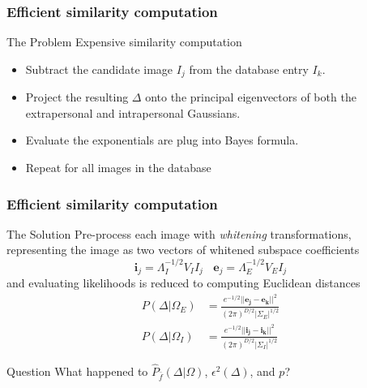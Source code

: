 \documentclass{beamer}
\begin{document}
\begin{frame}
\frametitle{Efficient similarity computation}
\begin{block}{The Problem}
Expensive similarity computation
\begin{itemize}
\pause
\item Subtract the candidate image $I_j$ from the database entry $I_k$.
\pause
\item Project the resulting $\Delta$ onto the principal eigenvectors of both the extrapersonal and intrapersonal Gaussians.
\pause
\item Evaluate the exponentials are plug into Bayes formula.
\pause
\item Repeat for all images in the database
\end{itemize}
\end{block}
\end{frame}

\begin{frame}
\frametitle{Efficient similarity computation}
\begin{block}{The Solution}
Pre-process each image with \emph{whitening} transformations, representing the image as two vectors of whitened subspace coefficients
\pause
\begin{equation}
\mathbf{i}_j=\Lambda_I^{-1/2}V_II_j\ \ \ \ \mathbf{e}_j=\Lambda_E^{-1/2}V_EI_j
\end{equation}
\pause
and evaluating likelihoods is reduced to computing Euclidean distances
\begin{equation}
\begin{split}
P(\Delta|\Omega_E)& = \frac{e^{-1/2}||\mathbf{e_j}-\mathbf{e_k}||^2}{(2\pi)^{D/2}|\Sigma_E|^{1/2}} \\
P(\Delta|\Omega_I)& = \frac{e^{-1/2}||\mathbf{i_j}-\mathbf{i_k}||^2}{(2\pi)^{D/2}|\Sigma_I|^{1/2}}
\end{split}
\end{equation}
\end{block}
\pause
\begin{block}{Question}
What happened to $\hat{P}_{\bar{f}}(\Delta|\Omega)$, $\epsilon^2(\Delta)$, and $p$?
\end{block}
\end{frame}
\end{document}
